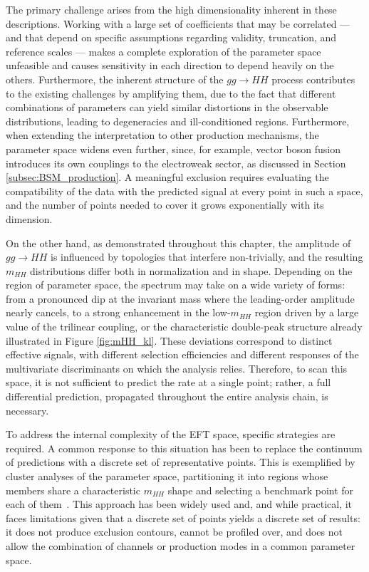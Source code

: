 The primary challenge arises from the high dimensionality inherent in these descriptions. Working with a large set of coefficients that may be correlated — and that depend on specific assumptions regarding validity, truncation, and reference scales — makes a complete exploration of the parameter space unfeasible and causes sensitivity in each direction to depend heavily on the others. Furthermore, the inherent structure of the $gg\to HH$ process contributes to the existing challenges by amplifying them, due to the fact that different combinations of parameters can yield similar distortions in the observable distributions, leading to degeneracies and ill-conditioned regions. Furthermore, when extending the interpretation to other production mechanisms, the parameter space widens even further, since, for example, vector boson fusion introduces its own couplings to the electroweak sector, as discussed in Section \ref{subsec:BSM_production}. A meaningful exclusion requires evaluating the compatibility of the data with the predicted signal at every point in such a space, and the number of points needed to cover it grows exponentially with its dimension.

On the other hand, as demonstrated throughout this chapter, the amplitude of $gg\to HH$ is influenced by topologies that interfere non-trivially, and the resulting $m_{HH}$ distributions differ both in normalization and in shape. Depending on the region of parameter space, the spectrum may take on a wide variety of forms: from a pronounced dip at the invariant mass where the leading-order amplitude nearly cancels, to a strong enhancement in the low-$m_{HH}$ region driven by a large value of the trilinear coupling, or the characteristic double-peak structure already illustrated in Figure \ref{fig:mHH_kl}. These deviations correspond to distinct effective signals, with different selection efficiencies and different responses of the multivariate discriminants on which the analysis relies. Therefore, to scan this space, it is not sufficient to predict the rate at a single point; rather, a full differential prediction, propagated throughout the entire analysis chain, is necessary.

To address the internal complexity of the EFT space, specific strategies are required. A common response to this situation has been to replace the continuum of predictions with a discrete set of representative points. This is exemplified by cluster analyses of the parameter space, partitioning it into regions whose members share a characteristic $m_{HH}$ shape and selecting a benchmark point for each of them~\cite{Carvalho:2015ttv,Carvalho:2016rys}. This approach has been widely used and, and while practical, it faces limitations given that a discrete set of points yields a discrete set of results: it does not produce exclusion contours, cannot be profiled over, and does not allow the combination of channels or production modes in a common parameter space.

